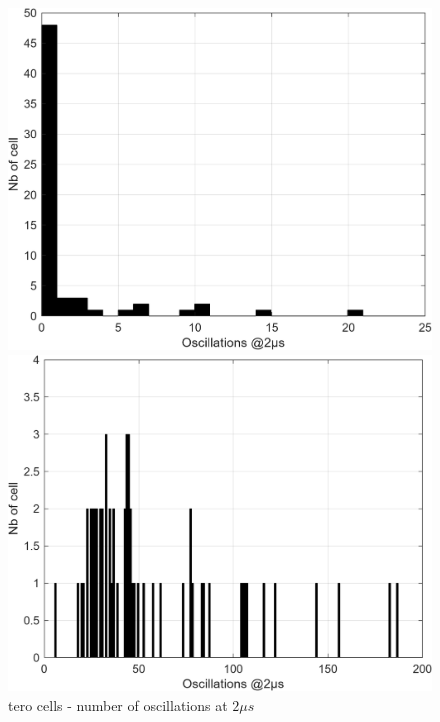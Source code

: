 \begin{figure}[H]
   \begin{minipage}[b]{0.5\linewidth} 
        \centering
        \includegraphics[width=\linewidth]{images/tero_4_oscillations_final.png}
   \end{minipage}
   \begin{minipage}[b]{0.5\linewidth}   
        \centering
        \includegraphics[width=\linewidth]{images/tero_8_oscillations_final.png}
   \end{minipage}
   \caption{\acrshort{tero} cells - number of oscillations at $2\mu s$\label{fig:tero_both_oscillation_final}}
\end{figure}





